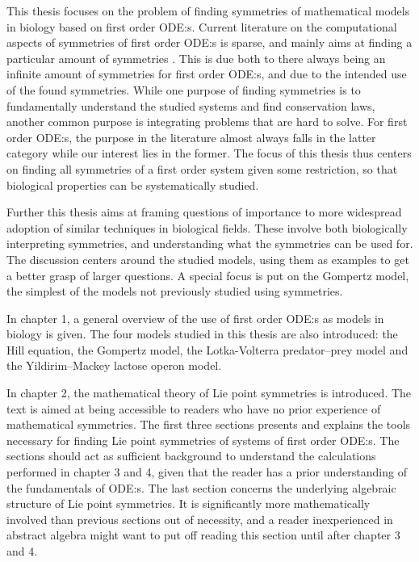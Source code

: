 This thesis focuses on the problem of finding symmetries of mathematical models in biology based on first order ODE:s.
Current literature on the computational aspects of symmetries of first order ODE:s is sparse, and mainly aims at finding a particular amount of symmetries \cite{chebterrab1997computer,chebterrab1998patterns}. %
This is due both to there always being an infinite amount of symmetries for first order ODE:s, and due to the intended use of the found symmetries.
While one purpose of finding symmetries is to fundamentally understand the studied systems and find conservation laws, another common purpose is integrating problems that are hard to solve.
For first order ODE:s, the purpose in the literature almost always falls in the latter category while our interest lies in the former. %
The focus of this thesis thus centers on finding all symmetries of a first order system given some restriction, so that biological properties can be systematically studied.

Further this thesis aims at framing questions of importance to more widespread adoption of similar techniques in biological fields.
These involve both biologically interpreting symmetries, and understanding what the symmetries can be used for.
The discussion centers around the studied models, using them as examples to get a better grasp of larger questions.
A special focus is put on the Gompertz model, the simplest of the models not previously studied using symmetries.

In chapter 1, a general overview of the use of first order ODE:s as models in biology is given.
The four models studied in this thesis are also introduced: the Hill equation, the Gompertz model, the Lotka-Volterra predator--prey model and the Yildirim--Mackey lactose operon model.

In chapter 2, the mathematical theory of Lie point symmetries is introduced.
The text is aimed at being accessible to readers who have no prior experience of mathematical symmetries.
The first three sections presents and explains the tools necessary for finding Lie point symmetries of systems of first order ODE:s.
The sections should act as sufficient background to understand the calculations performed in chapter 3 and 4, given that the reader has a prior understanding of the fundamentals of ODE:s.
The last section concerns the underlying algebraic structure of Lie point symmetries.
It is significantly more mathematically involved than previous sections out of necessity, and a reader inexperienced in abstract algebra might want to put off reading this section until after chapter 3 and 4.

